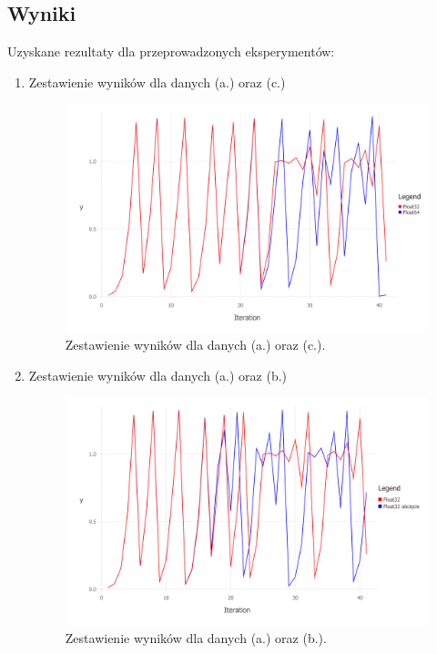 \documentclass{classrep}
\begin{document}
	\subsection{Wyniki}
		Uzyskane rezultaty dla przeprowadzonych eksperymentów:
		\begin{enumerate}[1.]
			\item Zestawienie wyników dla danych (a.) oraz (c.)
				\begin{figure}[h!]
  					\includegraphics[scale=0.5, width=\textwidth]{zad5/plot1.png}
  					\caption{Zestawienie wyników dla danych (a.) oraz (c.).}
				\end{figure}		
			\item Zestawienie wyników dla danych (a.) oraz (b.)
				\begin{figure}[h!] 
  					\includegraphics[scale=0.5, width=\textwidth]{zad5/plot2.png}
  					\caption{Zestawienie wyników dla danych (a.) oraz (b.).}
				\end{figure}
		\end{enumerate}
\end{document}
